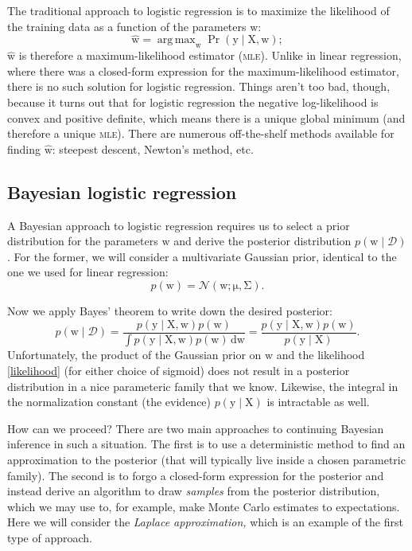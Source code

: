 \documentclass{article}
\newcommand{\acro}[1]{\textsc{\MakeLowercase{#1}}}
\newcommand{\given}{\mid}
\newcommand{\mc}[1]{\mathcal{#1}}
\newcommand{\data}{\mc{D}}
\newcommand{\intd}[1]{\,\mathrm{d}{#1}}
\newcommand{\mat}[1]{\bm{\mathrm{#1}}}
\renewcommand{\vec}[1]{\bm{\mathrm{#1}}}
\DeclareMathOperator*{\argmax}{arg\,max}
\begin{document}
The traditional approach to logistic regression is to maximize the
likelihood of the training data as a function of the parameters
$\vec{w}$:
\begin{equation*}
  \hat{\vec{w}}
  =
  \argmax_{\vec{w}}
  \Pr(\vec{y} \given \mat{X}, \vec{w});
\end{equation*}
$\hat{\vec{w}}$ is therefore a maximum-likelihood estimator
(\acro{MLE}).  Unlike in linear regression, where there was a
closed-form expression for the maximum-likelihood estimator, there is
no such solution for logistic regression.  Things aren't too bad,
though, because it turns out that for logistic regression the negative
log-likelihood is convex and positive definite, which means there is a
unique global minimum (and therefore a unique \acro{MLE}).  There are
numerous off-the-shelf methods available for finding $\hat{\vec{w}}$:
steepest descent, Newton's method, etc.

\subsection*{Bayesian logistic regression}

A Bayesian approach to logistic regression requires us to select a
prior distribution for the parameters $\vec{w}$ and derive the
posterior distribution $p(\vec{w} \given \data)$.  For the former, we
will consider a multivariate Gaussian prior, identical to the one we used
for linear regression:
\begin{equation*}
  p(\vec{w})
  =
  \mc{N}(\vec{w}; \vec{\mu}, \mat{\Sigma}).
\end{equation*}

Now we apply Bayes' theorem to write down the desired posterior:
\begin{equation*}
  p(\vec{w} \given \data)
  =
  \frac{p(\vec{y} \given \mat{X}, \vec{w}) p(\vec{w})}
       {\int p(\vec{y} \given \mat{X}, \vec{w}) p(\vec{w}) \intd{\vec{w}}}
  =
  \frac{p(\vec{y} \given \mat{X}, \vec{w}) p(\vec{w})}
       {p(\vec{y} \given \mat{X})}.
\end{equation*}
Unfortunately, the product of the Gaussian prior on $\vec{w}$ and the
likelihood \eqref{likelihood} (for either choice of sigmoid) does not
result in a posterior distribution in a nice parameteric family that
we know.  Likewise, the integral in the normalization constant (the
evidence) $p(\vec{y} \given \mat{X})$ is intractable as well.

How can we proceed?  There are two main approaches to continuing
Bayesian inference in such a situation.  The first is to use a
deterministic method to find an approximation to the posterior (that
will typically live inside a chosen parametric family).  The second is
to forgo a closed-form expression for the posterior and instead derive
an algorithm to draw \emph{samples} from the posterior distribution,
which we may use to, for example, make Monte Carlo estimates to
expectations.  Here we will consider the \emph{Laplace approximation,}
which is an example of the first type of approach.
\end{document}
